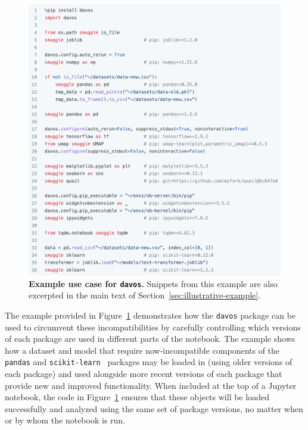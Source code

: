 \documentclass[preprint,12pt,a4paper]{elsarticle}
\begin{document}
\begin{figure}[tp]
\centering
\includegraphics[width=\textwidth]{figs/illustrative_example}
\caption{\small \textbf{Example use case for \texttt{davos}.}
  Snippets from this example are also excerpted in the main text of
  Section~\ref{sec:illustrative-example}.}
\label{fig:illustrative-example}
\end{figure}

The example provided in Figure~\ref{fig:illustrative-example}
demonstrates how the \texttt{davos} package can be used to circumvent
these incompatibilities by carefully controlling which versions of
each package are used in different parts of the notebook.  The example
shows how a dataset and model that require now-incompatible components of
the \texttt{pandas} and \texttt{scikit-learn}~\cite{PedrEtal11}
packages may be loaded in (using older versions of each package) and used
alongside more recent versions of each package that provide new and improved functionality.
When included at the top of a Jupyter notebook, the code in Figure~\ref{fig:illustrative-example}
ensures that these objects will be loaded successfully and analyzed using the same set
of package versions, no matter when or by whom the notebook is run.
\end{document}
